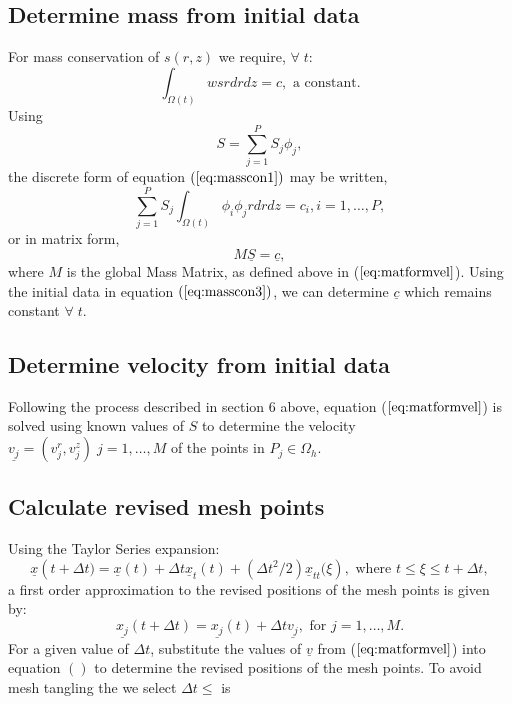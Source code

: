 \documentclass[11pt]{article}
\newcommand{\D}{\Delta}
\newcommand{\ul}{\underline}
\newcommand{\Om}{\Omega}
\begin{document}
\subsection{Determine mass from initial data}
For mass conservation of $s(r,z)$ we require, $\forall \;t$:
\begin{equation}
\label{eq:masscon1}
\int_{\Om(t)}wsrdrdz = c, \text{ a constant}.
\end{equation}
Using $$S = \sum_{j=1}^PS_j\phi_j,$$ the discrete form of equation $(\ref{eq:masscon1})$ may be written,
\begin{equation}
\label{eq:masscon2}
\sum_{j=1}^PS_j\int_{\Om(t)}\phi_i\phi_jrdrdz = c_i, i = 1,\dots,P,
\end{equation}
or in matrix form,
\begin{equation}
\label{eq:masscon3}
M\ul{S} = \ul{c},
\end{equation}
where $M$ is the global Mass Matrix, as defined above in ($\ref{eq:matformvel}$).  Using the initial data in equation $(\ref{eq:masscon3})$, we can determine $\ul{c}$ which remains constant $\forall\; t$.
\subsection{Determine velocity from initial data}
Following the process described in section 6 above, equation ($\ref{eq:matformvel}$) is solved using known values of $S$ to determine the velocity $\ul{v_j} = (v_j^r,v_j^z)\; j=1,\dots,M$ of the points in $P_j \in\Om_h$.
\subsection{Calculate revised mesh points}
Using the Taylor Series expansion:
$$ \ul{x}({t+\D{t}) = \ul{x}(t) +\D{t}\ul{x}_t(t)+(\D{t}^2/2)\ul{x}_{tt}(\xi}), \text{ where } t\leq\xi\leq{t+\D{t}},$$
a first order approximation to the revised positions of the mesh points is given by:
\begin{equation}
\label{eq:movmesh1}
\ul{x_j}(t+\D{t}) = \ul{x_j}(t) +\D{t}\ul{v_j}, \text{ for } j=1,\dots,M.
\end{equation}
For a given value of $\D{t}$, substitute the values of $\ul{v}$ from ($\ref{eq:matformvel}$) into equation $(\label{eq:movmesh1})$ to determine the revised positions of the mesh points. To avoid mesh tangling the we select $\D{t}\leq $ is 
\end{document}
